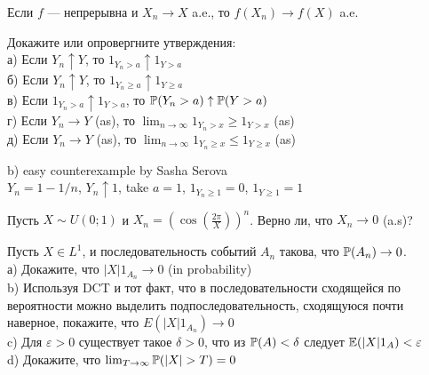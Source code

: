 \begin{problem}
Если $f$ — непрерывна и $X_{n}\rightarrow X$ a.e., то
$f(X_{n})\rightarrow f(X)$ a.e.

\begin{sol}

\end{sol}
\end{problem}

\begin{problem}
Докажите или опровергните утверждения: \\
а) Если $Y_{n}\uparrow Y$, то $1_{Y_{n}>a}\uparrow 1_{Y>a}$ \\
б) Если $Y_{n}\uparrow Y$, то $1_{Y_{n}\ge a}\uparrow 1_{Y\ge a}$ \\
в) Если $1_{Y_{n}>a}\uparrow 1_{Y>a}$, то $\P(Y_{n}>a)\uparrow
\P(Y>a)$ \\
г) Если $Y_{n}\rightarrow Y$ (as), то
$\lim_{n\to\infty}1_{Y_{n}>x}\ge 1_{Y>x}$ (as) \\
д) Если $Y_{n}\rightarrow Y$ (as), то
$\lim_{n\to\infty}1_{Y_{n}\ge x}\le 1_{Y\ge x}$ (as)

\begin{sol}

b) easy counterexample by Sasha Serova \\
$Y_{n}=1-1/n$, $Y_{n}\uparrow 1$, take $a=1$, $1_{Y_{n}\ge 1}=0$,
$1_{Y\ge 1}=1$
\end{sol}
\end{problem}

\begin{problem}
Пусть $X\sim U(0;1)$ и $X_{n}=(\cos(\frac{2\pi}{X}))^{n}$. Верно
ли, что
$X_{n}\rightarrow 0$ (a.s)?

\begin{sol}

\end{sol}
\end{problem}

\begin{problem}
Пусть $X\in L^{1}$, и последовательность событий $A_{n}$ такова,
что $\P(A_{n})\rightarrow 0$. \\
а) Докажите, что $|X| 1_{A_{n}} \rightarrow 0$ (in probability) \\
b) Используя DCT и тот факт, что в последовательности сходящейся
по вероятности можно выделить подпоследовательность, сходящуюся
почти наверное, покажите, что $E\left(|X| 1_{A_{n}}\right)
\rightarrow 0$
\\
c) Для $\varepsilon>0$ существует такое $\delta>0$,
что из $\P(A)<\delta$ следует $\E(|X|1_{A})<\varepsilon$ \\
d) Докажите, что $\lim_{T\to\infty}\P(|X|>T)=0$

\begin{sol}

\end{sol}
\end{problem}

